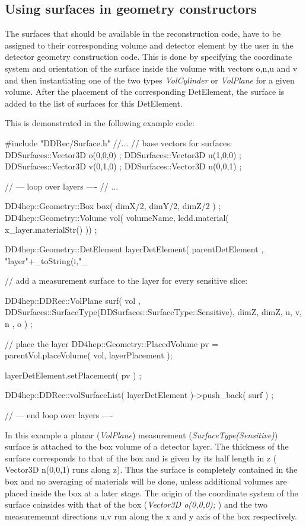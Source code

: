 \documentclass[10pt,a4paper]{article}
\begin{document}
\subsection{Using surfaces in geometry constructors}
\label{subsec:ddrec-surfaces-constructors}
The surfaces that should be available in the reconstruction code, 
have to be assigned to their corresponding volume and detector element by the 
user in the detector geometry construction code. 
This is done by specifying the coordinate system
and orientation of the surface inside the volume with vectors o,n,u and v 
and then instantiating one of the two types {\em VolCylinder} or {\em VolPlane} for a 
given volume.
After the placement of the corresponding DetElement, the surface is added to the
list of surfaces for this DetElement.

\noindent
This is demonstrated in the  following example code:

\begin{code}
  #include "DDRec/Surface.h"
  //...
  // base vectors for surfaces:
  DDSurfaces::Vector3D o(0,0,0) ;
  DDSurfaces::Vector3D u(1,0,0) ;
  DDSurfaces::Vector3D v(0,1,0) ;
  DDSurfaces::Vector3D n(0,0,1) ;

  // --- loop over layers ----
  // ...

    DD4hep::Geometry::Box  box( dimX/2, dimY/2, dimZ/2 ) ;
    DD4hep::Geometry::Volume vol( volumeName, lcdd.material( x_layer.materialStr() )) ;

    DD4hep::Geometry::DetElement layerDetElement( parentDetElement , "layer"+_toString(i,"_%

    // add a measurement surface to the layer for every sensitive slice:

    DD4hep::DDRec::VolPlane surf( vol , 
                          DDSurfaces::SurfaceType(DDSurfaces::SurfaceType::Sensitive),
                          dimZ, dimZ, 
                          u, v, n , o ) ; 

    // place the layer
    DD4hep::Geometry::PlacedVolume pv = parentVol.placeVolume(  vol, layerPlacement );

    layerDetElement.setPlacement( pv ) ;

    DD4hep::DDRec::volSurfaceList( layerDetElement )->push_back( surf ) ;

  // --- end loop over layers ----

\end{code}
In this example a planar ({\em VolPlane}) measurement ({\em SurfaceType(Sensitive)})
surface is attached to the box volume of a detector layer.
The thickness of the surface corresponds to that of the box and is given by its half length in z
( Vector3D n(0,0,1) runs along z). Thus the surface is completely contained in 
the box and no averaging of materials will be done, unless additional volumes
are placed inside the box at a later stage. 
The origin of the coordinate system of the surface coinsides with that of the box
({\em Vector3D o(0,0,0); })
and the two measurememnt directions u,v run along the x and y axis of the box
respectively.
\end{document}
